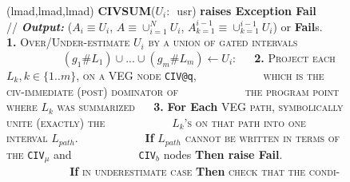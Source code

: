 \documentclass{sig-alternate}
\begin{document}
\begin{figure}[t]
\begin{small}
({\sc lmad},{\sc lmad},{\sc lmad}) {\bf CIVSUM}($U_i :$~{\sc{}usr}) {\bf raises Exception Fail}\vspace{1ex} \newline
$\mbox{ }\mbox{ }$// {\bf {\em Output:}} 
($A_i \equiv U_i$, $A \equiv \cup_{i=1}^{N} U_i$, $A_{k=1}^{i-1} \equiv \cup_{k=1}^{i-1} U_i$) or {\bf Fail}s. \vspace{2ex} \newline
$\mbox{ }\mbox{ }${\bf1.} \textsc{Over/Under-estimate $U_i$ by a union of gated intervals}\vspace{1ex} \newline
$\mbox{ }\mbox{ }\mbox{ }\mbox{ }\mbox{ }\mbox{ }\mbox{ }$ $(g_1\#L_1) \cup ... \cup (g_m\#L_m)\leftarrow U_i$: \vspace{2ex} \newline
$\mbox{ }\mbox{ }${\bf2.} \textsc{Project each} $L_k, k\in\{1..m\}$, \textsc{on a VEG node} {\tt CIV@q}, \vspace{1ex} \newline
$\mbox{ }\mbox{ }\mbox{ }\mbox{ }\mbox{ }\mbox{ }\mbox{ }\mbox{ }$
            \textsc{which is the civ-immediate (post) dominator of} \vspace{1ex} \newline 
$\mbox{ }\mbox{ }\mbox{ }\mbox{ }\mbox{ }\mbox{ }\mbox{ }\mbox{ }$
            \textsc{the program point where} $L_k$ \textsc{was summarized} \vspace{2ex} \newline 
$\mbox{ }\mbox{ }${\bf3.} {\bf For Each} \textsc{VEG path, symbolically unite (exactly) the}\vspace{1ex} \newline 
$\mbox{ }\mbox{ }\mbox{ }\mbox{ }\mbox{ }\mbox{ }\mbox{ }\mbox{ }$
            \textsc{$L_k$'s on that path into one interval $L_{path}$.}\vspace{1.5ex}\newline 
$\mbox{ }\mbox{ }\mbox{ }\mbox{ }\mbox{ }\mbox{ }\mbox{ }\mbox{ }$
            {\bf If} $L_{path}$ \textsc{cannot be written in terms of the} {\tt CIV$_\mu$} {\sc and} 
$\mbox{ }\mbox{ }\mbox{ }\mbox{ }\mbox{ }\mbox{ }\mbox{ }\mbox{ }$
            {\tt CIV$_b$} {\sc nodes} {\bf Then raise Fail}.\vspace{1.5ex} \newline
$\mbox{ }\mbox{ }\mbox{ }\mbox{ }\mbox{ }\mbox{ }\mbox{ }\mbox{ }$
            {\bf If} \textsc{in underestimate case} {\bf Then} \textsc{check that the condi-}

\end{small}
\end{figure}
\end{document}

